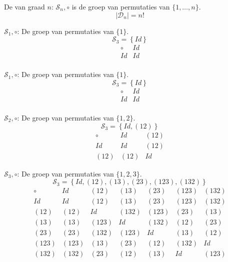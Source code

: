 \documentclass[main.tex]{subfiles}
\begin{document}
\begin{de}
  De  van graad $n$: $\mathcal{S}_{n},\circ$ is de groep van permutaties van $\{ 1,\dotsc,n \}$.
  \[ |\mathcal{D}_{n}| = n! \]
  \commn \cycln
\end{de}

\begin{vb}
  $\mathcal{S}_{1},\circ$: De groep van permutaties van $\{ 1 \}$.
  \[ \mathcal{S}_{3} = \left\{ Id \right\} \]
  \[
  \begin{array}{c|c}
    \circ & Id \\
    \hline
    Id & Id\\
  \end{array}
  \]
\commj {}
\end{vb}

\begin{vb}
  $\mathcal{S}_{1},\circ$: De groep van permutaties van $\{ 1 \}$.
  \[ \mathcal{S}_{3} = \left\{ Id \right\} \]
  \[
  \begin{array}{c|c}
    \circ & Id \\
    \hline
    Id & Id\\
  \end{array}
  \]
\commj {}
\end{vb}

\begin{vb}
  $\mathcal{S}_{2},\circ$: De groep van permutaties van $\{ 1,2 \}$.
  \[ \mathcal{S}_{3} = \left\{ Id, (12) \right\} \]
  \[
  \begin{array}{c|cc}
    \circ & Id & (12) \\
    \hline
    Id & Id & (12)\\
    (12) & (12) & Id
  \end{array}
  \]
\commj {}
\end{vb}

\begin{vb}
  \label{vb:groep-s3}
  $\mathcal{S}_{3},\circ$: De groep van permutaties van $\{ 1,2,3 \}$.
  \[ \mathcal{S}_{3} = \left\{ Id, (12), (13), (23), (123), (132) \right\} \]
  \[
  \begin{array}{c|cccccc}
    \circ & Id & (12) & (13) & (23) & (123) & (132) \\
    \hline
    Id & Id & (12) & (13) & (23) & (123) & (132)\\
    (12) & (12) & Id & (132) & (123) & (23) & (13)\\
    (13) & (13) & (123) & Id & (132) & (12) & (23)\\
    (23) & (23) & (132) & (123) & Id & (13) & (12)\\
    (123) & (123) & (13) & (23) & (12) & (132) & Id\\
    (132) & (132) & (23) & (12) & (13) & Id & (123)\\
  \end{array}
  \]
\commn \cycln
\end{vb}
\end{document}
